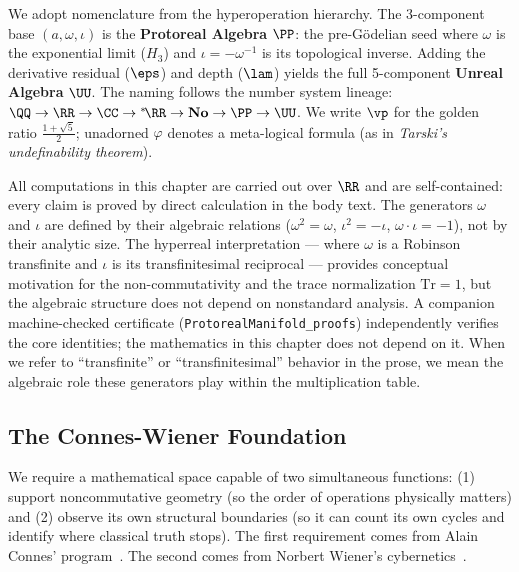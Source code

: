 \begin{remark}\label{rem:hyper-tower}
We adopt nomenclature from the hyperoperation hierarchy. The 3-component base $(a, \omega, \iota)$ is the \textbf{Protoreal Algebra} $\PP$: the pre-G\"odelian seed where $\omega$ is the exponential limit ($H_3$) and $\iota = -\omega^{-1}$ is its topological inverse. Adding the derivative residual ($\eps$) and depth ($\lam$) yields the full 5-component \textbf{Unreal Algebra} $\UU$. The naming follows the number system lineage: $\QQ \to \RR \to \CC \to {}^*\!\RR \to \mathbf{No} \to \PP \to \UU$. We write $\vp$ for the golden ratio $\tfrac{1+\sqrt{5}}{2}$; unadorned $\varphi$ denotes a meta-logical formula (as in \emph{Tarski's undefinability theorem}).
\end{remark}

\begin{remark}\label{rem:convention}
All computations in this chapter are carried out over $\RR$ and are
self-contained: every claim is proved by direct calculation in the body
text. The generators $\omega$ and $\iota$ are defined by their algebraic
relations ($\omega^2 = \omega$, $\iota^2 = -\iota$,
$\omega \cdot \iota = -1$), not by their analytic size. The hyperreal
interpretation --- where $\omega$ is a Robinson transfinite and $\iota$
is its transfinitesimal reciprocal --- provides conceptual motivation
for the non-commutativity and the trace normalization $\mathrm{Tr} = 1$,
but the algebraic structure does not depend on nonstandard analysis.
A companion machine-checked certificate
(\texttt{ProtorealManifold\_proofs}) independently verifies the
core identities; the mathematics in this chapter does not depend on it.
When we refer to ``transfinite'' or ``transfinitesimal'' behavior in the
prose, we mean the algebraic role these generators play within the
multiplication table.
\end{remark}

\subsection{The Connes-Wiener Foundation}\label{sec:connes-wiener}

We require a mathematical space capable of two simultaneous functions: (1) support noncommutative geometry (so the order of operations physically matters) and (2) observe its own structural boundaries (so it can count its own cycles and identify where classical truth stops). The first requirement comes from Alain Connes' program~\cite{connes}. The second comes from Norbert Wiener's cybernetics~\cite{wiener}.

